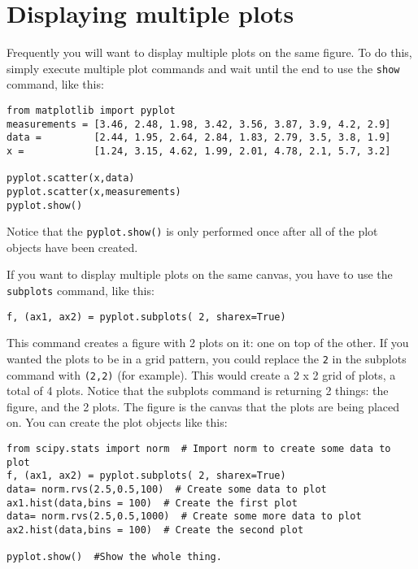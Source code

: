 \section{Displaying multiple plots}
Frequently you will want to display multiple plots on the same figure.
 To do this, simply execute multiple plot commands and wait until the
 end to use the \texttt{show} command, like this:
\begin{Verbatim}
from matplotlib import pyplot
measurements = [3.46, 2.48, 1.98, 3.42, 3.56, 3.87, 3.9, 4.2, 2.9]
data =         [2.44, 1.95, 2.64, 2.84, 1.83, 2.79, 3.5, 3.8, 1.9]
x =            [1.24, 3.15, 4.62, 1.99, 2.01, 4.78, 2.1, 5.7, 3.2]

pyplot.scatter(x,data)
pyplot.scatter(x,measurements)
pyplot.show()

\end{Verbatim}
Notice that the \texttt{pyplot.show()}  is only performed once after
all of the plot objects have been created.

If you want to display multiple plots on the same canvas, you have to
use the \texttt{subplots} command, like this:
\begin{Verbatim}
f, (ax1, ax2) = pyplot.subplots( 2, sharex=True) 
\end{Verbatim}

This command creates a figure with 2 plots on it: one on top of the other.
If you wanted the plots to be in a grid pattern, you could replace the
\texttt{2} in the subplots command with \texttt{(2,2)} (for example).
This would create a 2 x 2 grid of plots, a total of 4 plots.  Notice
that the subplots command is returning 2 things: the figure, and the 2
plots.  The figure is the canvas that the plots are being placed on.
You can create the plot objects like this:
\begin{Verbatim}
from scipy.stats import norm  # Import norm to create some data to plot
f, (ax1, ax2) = pyplot.subplots( 2, sharex=True) 
data= norm.rvs(2.5,0.5,100)  # Create some data to plot
ax1.hist(data,bins = 100)  # Create the first plot
data= norm.rvs(2.5,0.5,1000)  # Create some more data to plot
ax2.hist(data,bins = 100)  # Create the second plot

pyplot.show()  #Show the whole thing.


\end{Verbatim}


